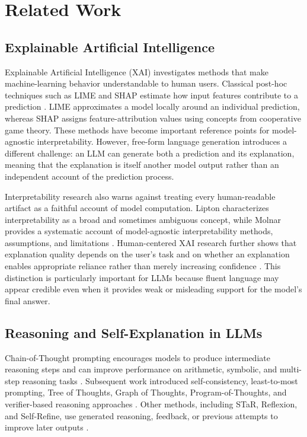 \documentclass{article}
\begin{document}
\section{Related Work}

\subsection{Explainable Artificial Intelligence}

Explainable Artificial Intelligence (XAI) investigates methods that
make machine-learning behavior understandable to human users.
Classical post-hoc techniques such as LIME and SHAP estimate how input
features contribute to a prediction
\cite{ribeiro2016trust,lundberg2017unified}. LIME approximates a
model locally around an individual prediction, whereas SHAP assigns
feature-attribution values using concepts from cooperative game theory.
These methods have become important reference points for model-agnostic
interpretability. However, free-form language generation introduces a
different challenge: an LLM can generate both a prediction and its
explanation, meaning that the explanation is itself another model
output rather than an independent account of the prediction process.

Interpretability research also warns against treating every
human-readable artifact as a faithful account of model computation.
Lipton characterizes interpretability as a broad and sometimes
ambiguous concept, while Molnar provides a systematic account of
model-agnostic interpretability methods, assumptions, and limitations
\cite{lipton2018mythos,molnar2022interpretable}. Human-centered XAI
research further shows that explanation quality depends on the user's
task and on whether an explanation enables appropriate reliance rather
than merely increasing confidence
\cite{miller2019explanation,brahman2022human}. This distinction is
particularly important for LLMs because fluent language may appear
credible even when it provides weak or misleading support for the
model's final answer.

\subsection{Reasoning and Self-Explanation in LLMs}

Chain-of-Thought prompting encourages models to produce intermediate
reasoning steps and can improve performance on arithmetic, symbolic,
and multi-step reasoning tasks \cite{wei2022chain}. Subsequent work
introduced self-consistency, least-to-most prompting, Tree of Thoughts,
Graph of Thoughts, Program-of-Thoughts, and verifier-based reasoning
approaches
\cite{wang2023selfconsistency,zhou2023least,yao2023tree,
besta2024graph,chen2023program,chen2023machine}. Other methods,
including STaR, Reflexion, and Self-Refine, use generated reasoning,
feedback, or previous attempts to improve later outputs
\cite{zelikman2022star,shinn2023reflexion,madaan2023selfrefine}.
\end{document}
